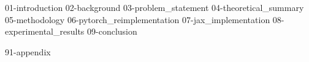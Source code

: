 \documentclass[a4paper,oneside,10pt,ngerman,english]{scrbook}
\begin{document}

\mainmatter


{01-introduction}
{02-background}
{03-problem_statement}
{04-theoretical_summary}
{05-methodology}
{06-pytorch_reimplementation}
{07-jax_implementation}
{08-experimental_results}
{09-conclusion}


\cleardoubleoddpage
\printbibliography

\appendix


{91-appendix}


\cleardoubleoddpage
\end{document}
